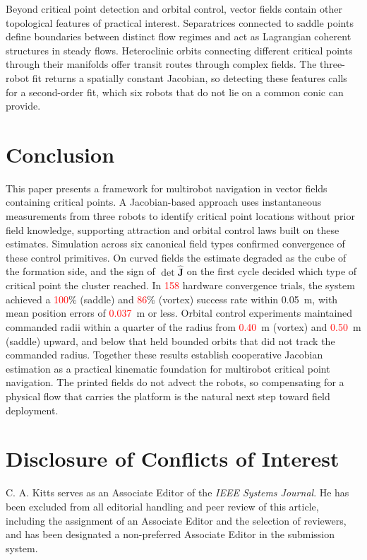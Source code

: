 \documentclass[lettersize,journal]{IEEEtran}
\newcommand{\syn}[1]{\textcolor{red}{#1}}
\begin{document}
Beyond critical point detection and orbital control, vector fields contain other topological features of practical interest. Separatrices connected to saddle points define boundaries between distinct flow regimes and act as Lagrangian coherent structures in steady flows. Heteroclinic orbits connecting different critical points through their manifolds offer transit routes through complex fields. The three-robot fit returns a spatially constant Jacobian, so detecting these features calls for a second-order fit, which six robots that do not lie on a common conic can provide.



\section{Conclusion}
\noindent

This paper presents a framework for multirobot navigation in vector fields containing critical points. A Jacobian-based approach uses instantaneous measurements from three robots to identify critical point locations without prior field knowledge, supporting attraction and orbital control laws built on these estimates. Simulation across six canonical field types confirmed convergence of these control primitives. On curved fields the estimate degraded as the cube of the formation side, and the sign of $\det\hat{\mathbf{J}}$ on the first cycle decided which type of critical point the cluster reached. In \syn{158} hardware convergence trials, the system achieved a \syn{100}\% (saddle) and \syn{86}\% (vortex) success rate within 0.05~m, with mean position errors of \syn{0.037}~m or less. Orbital control experiments maintained commanded radii within a quarter of the radius from \syn{0.40}~m (vortex) and \syn{0.50}~m (saddle) upward, and below that held bounded orbits that did not track the commanded radius.
Together these results establish cooperative Jacobian estimation as a practical kinematic foundation for multirobot critical point navigation. The printed fields do not advect the robots, so compensating for a physical flow that carries the platform is the natural next step toward field deployment.


\section*{Disclosure of Conflicts of Interest}

C. A. Kitts serves as an Associate Editor of the \textit{IEEE Systems Journal}. He has been excluded from all editorial handling and peer review of this article, including the assignment of an Associate Editor and the selection of reviewers, and has been designated a non-preferred Associate Editor in the submission system.
\end{document}
